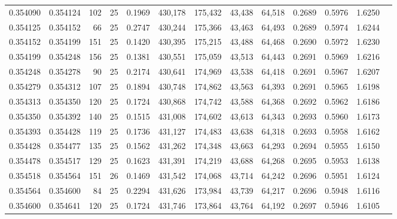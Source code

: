 \begin{tabular}{rrrrrrrrrrrrr}
0.354090 & 0.354124 &   102 &  25 &                                     0.1969 & 430,178 & 175,432 &  43,438 &  64,518 & 0.2689 & 0.5976 & 1.6250 \\
0.354125 & 0.354152 &    66 &  25 &                                     0.2747 & 430,244 & 175,366 &  43,463 &  64,493 & 0.2689 & 0.5974 & 1.6244 \\
0.354152 & 0.354199 &   151 &  25 &                                     0.1420 & 430,395 & 175,215 &  43,488 &  64,468 & 0.2690 & 0.5972 & 1.6230 \\
0.354199 & 0.354248 &   156 &  25 &                                     0.1381 & 430,551 & 175,059 &  43,513 &  64,443 & 0.2691 & 0.5969 & 1.6216 \\
0.354248 & 0.354278 &    90 &  25 &                                     0.2174 & 430,641 & 174,969 &  43,538 &  64,418 & 0.2691 & 0.5967 & 1.6207 \\
0.354279 & 0.354312 &   107 &  25 &                                     0.1894 & 430,748 & 174,862 &  43,563 &  64,393 & 0.2691 & 0.5965 & 1.6198 \\
0.354313 & 0.354350 &   120 &  25 &                                     0.1724 & 430,868 & 174,742 &  43,588 &  64,368 & 0.2692 & 0.5962 & 1.6186 \\
0.354350 & 0.354392 &   140 &  25 &                                     0.1515 & 431,008 & 174,602 &  43,613 &  64,343 & 0.2693 & 0.5960 & 1.6173 \\
0.354393 & 0.354428 &   119 &  25 &                                     0.1736 & 431,127 & 174,483 &  43,638 &  64,318 & 0.2693 & 0.5958 & 1.6162 \\
0.354428 & 0.354477 &   135 &  25 &                                     0.1562 & 431,262 & 174,348 &  43,663 &  64,293 & 0.2694 & 0.5955 & 1.6150 \\
0.354478 & 0.354517 &   129 &  25 &                                     0.1623 & 431,391 & 174,219 &  43,688 &  64,268 & 0.2695 & 0.5953 & 1.6138 \\
0.354518 & 0.354564 &   151 &  26 &                                     0.1469 & 431,542 & 174,068 &  43,714 &  64,242 & 0.2696 & 0.5951 & 1.6124 \\
0.354564 & 0.354600 &    84 &  25 &                                     0.2294 & 431,626 & 173,984 &  43,739 &  64,217 & 0.2696 & 0.5948 & 1.6116 \\
0.354600 & 0.354641 &   120 &  25 &                                     0.1724 & 431,746 & 173,864 &  43,764 &  64,192 & 0.2697 & 0.5946 & 1.6105 \\

\end{tabular}
